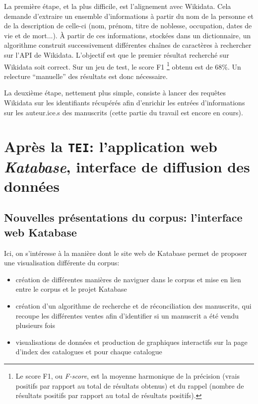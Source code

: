 \documentclass[a4paper, 12pt, twoside]{book}
\newcommand{\tei}{\texttt{TEI}}
\begin{document}
La première étape, et la plus difficile, est l'alignement avec Wikidata. Cela demande d'extraire un ensemble d'informations à partir du nom de la personne et de la description de celle-ci (nom, prénom, titre de noblesse, occupation, dates de vie et de mort...). À partir de ces informations, stockées dans un dictionnaire, un algorithme construit successivement différentes chaînes de caractères à rechercher sur l'API de Wikidata. L'objectif est que le premier résultat recherché sur Wikidata soit correct. Sur un jeu de test, le score F1 \footnote{Le score F1, ou \textit{F-score}, est la moyenne harmonique de la précision (vrais positifs par rapport au total de résultats obtenus) et du rappel (nombre de résultats positifs par rapport au total de résultats positifs).} obtenu est de 68\%. Un relecture \enquote{manuelle} des résultats est donc nécessaire.

La deuxième étape, nettement plus simple, consiste à lancer des requêtes Wikidata sur les identifiants récupérés afin d'enrichir les entrées d'informations sur les auteur.ice.s des manuscrits (cette partie du travail est encore en cours).




\part{Après la \tei{}: l'application web \textit{Katabase}, interface de diffusion des données}
\chapter{Nouvelles présentations du corpus: l'interface web Katabase}
Ici, on s'intéresse à la manière dont le site web de Katabase permet de proposer une visualisation différente du corpus:
\begin{itemize}
 \item création de différentes manières de naviguer dans le corpus et mise en lien entre le corpus et le projet Katabase
 \item création d'un algorithme de recherche et de réconciliation des manuscrits, qui recoupe les différentes ventes afin d'identifier si un manuscrit a été vendu plusieurs fois
 \item visualisations de données et production de graphiques interactifs sur la page d'index des catalogues et pour chaque catalogue
\end{itemize}
\end{document}
